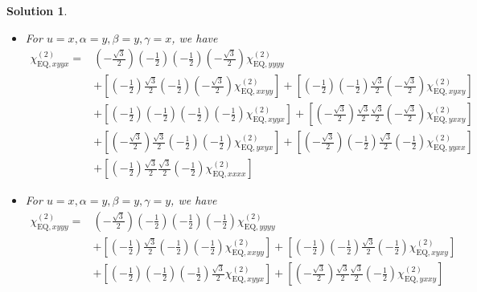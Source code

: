 \documentclass[UTF8,10pt,a4paper]{article}
\theoremstyle{Problem}
\theoremstyle{Solution}
\newtheorem*{sol}{Solution}
\begin{document}
\begin{sol}
\begin{itemize}
\begin{align}
&
\end{align}\normalsize
\item For $u=x,\alpha=y,\beta=y,\gamma=x$, we have
\footnotesize\begin{align}
\nonumber\chi_{\text{EQ},xyyx}^{(2)}=&\left(-\frac{\sqrt{3}}{2}\right)\left(-\frac{1}{2}\right)\left(-\frac{1}{2}\right)\left(-\frac{\sqrt{3}}{2}\right)\chi_{\text{EQ},yyyy}^{(2)}\\
\nonumber&+\left[\left(-\frac{1}{2}\right)\frac{\sqrt{3}}{2}\left(-\frac{1}{2}\right)\left(-\frac{\sqrt{3}}{2}\right)\chi_{\text{EQ},xxyy}^{(2)}\right]+\left[\left(-\frac{1}{2}\right)\left(-\frac{1}{2}\right)\frac{\sqrt{3}}{2}\left(-\frac{\sqrt{3}}{2}\right)\chi_{\text{EQ},xyxy}^{(2)}\right]\\
\nonumber&+\left[\left(-\frac{1}{2}\right)\left(-\frac{1}{2}\right)\left(-\frac{1}{2}\right)\left(-\frac{1}{2}\right)\chi_{\text{EQ},xyyx}^{(2)}\right]+\left[\left(-\frac{\sqrt{3}}{2}\right)\frac{\sqrt{3}}{2}\frac{\sqrt{3}}{2}\left(-\frac{\sqrt{3}}{2}\right)\chi_{\text{EQ},yxxy}^{(2)}\right]\\
\nonumber&+\left[\left(-\frac{\sqrt{3}}{2}\right)\frac{\sqrt{3}}{2}\left(-\frac{1}{2}\right)\left(-\frac{1}{2}\right)\chi_{\text{EQ},yxyx}^{(2)}\right]+\left[\left(-\frac{\sqrt{3}}{2}\right)\left(-\frac{1}{2}\right)\frac{\sqrt{3}}{2}\left(-\frac{1}{2}\right)\chi_{\text{EQ},yyxx}^{(2)}\right]\\
&+\left[\left(-\frac{1}{2}\right)\frac{\sqrt{3}}{2}\frac{\sqrt{3}}{2}\left(-\frac{1}{2}\right)\chi_{\text{EQ},xxxx}^{(2)}\right]
\end{align}\normalsize
\item For $u=x,\alpha=y,\beta=y,\gamma=y$, we have
\footnotesize\begin{align}
\nonumber\chi_{\text{EQ},xyyy}^{(2)}=&\left(-\frac{\sqrt{3}}{2}\right)\left(-\frac{1}{2}\right)\left(-\frac{1}{2}\right)\left(-\frac{1}{2}\right)\chi_{\text{EQ},yyyy}^{(2)}\\
\nonumber&+\left[\left(-\frac{1}{2}\right)\frac{\sqrt{3}}{2}\left(-\frac{1}{2}\right)\left(-\frac{1}{2}\right)\chi_{\text{EQ},xxyy}^{(2)}\right]+\left[\left(-\frac{1}{2}\right)\left(-\frac{1}{2}\right)\frac{\sqrt{3}}{2}\left(-\frac{1}{2}\right)\chi_{\text{EQ},xyxy}^{(2)}\right]\\
\nonumber&+\left[\left(-\frac{1}{2}\right)\left(-\frac{1}{2}\right)\left(-\frac{1}{2}\right)\frac{\sqrt{3}}{2}\chi_{\text{EQ},xyyx}^{(2)}\right]+\left[\left(-\frac{\sqrt{3}}{2}\right)\frac{\sqrt{3}}{2}\frac{\sqrt{3}}{2}\left(-\frac{1}{2}\right)\chi_{\text{EQ},yxxy}^{(2)}\right]\\

\end{align}
\end{itemize}
\end{sol}
\end{document}
